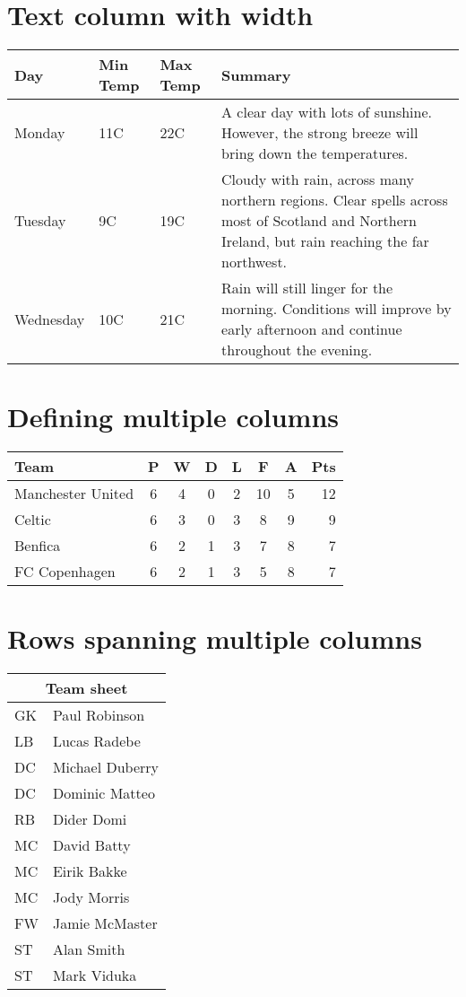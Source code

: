 \documentclass{article}
\begin{document}
  \section{Text column with width}

  \begin{center}
    \begin{tabular}{ | l | l | l | p{5cm} |}
      \hline
      Day & Min Temp & Max Temp & Summary \\ \hline
      Monday & 11C & 22C & A clear day with lots of sunshine.
      However, the strong breeze will bring down the temperatures. \\ \hline
      Tuesday & 9C & 19C & Cloudy with rain, across many northern regions. Clear spells
      across most of Scotland and Northern Ireland,
      but rain reaching the far northwest. \\ \hline
      Wednesday & 10C & 21C & Rain will still linger for the morning.
      Conditions will improve by early afternoon and continue
      throughout the evening. \\
      \hline
    \end{tabular}
  \end{center}

  \section{Defining multiple columns}

  \begin{tabular}{l*{6}{c}r}
    Team              & P & W & D & L & F  & A & Pts \\
    \hline
    Manchester United & 6 & 4 & 0 & 2 & 10 & 5 & 12  \\
    Celtic            & 6 & 3 & 0 & 3 &  8 & 9 &  9  \\
    Benfica           & 6 & 2 & 1 & 3 &  7 & 8 &  7  \\
    FC Copenhagen     & 6 & 2 & 1 & 3 &  5 & 8 &  7  \\
  \end{tabular}

  \section{Rows spanning multiple columns}

  \begin{tabular}{ |l|l| }
    \hline
    \multicolumn{2}{|c|}{Team sheet} \\
    \hline
    GK & Paul Robinson \\
    LB & Lucas Radebe \\
    DC & Michael Duberry \\
    DC & Dominic Matteo \\
    RB & Dider Domi \\
    MC & David Batty \\
    MC & Eirik Bakke \\
    MC & Jody Morris \\
    FW & Jamie McMaster \\
    ST & Alan Smith \\
    ST & Mark Viduka \\
    \hline
  \end{tabular}
\end{document}
